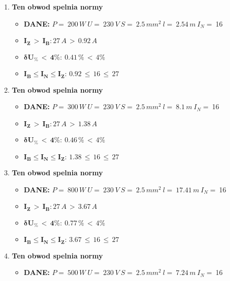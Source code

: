 \begin{enumerate}
\item \textcolor{Green}{\cmark} \textbf{Ten obwod spelnia normy} 
\begin{itemize}
\item[] \textbf{DANE: } \: $ P = \:200\, W\: U = \:230\: V\: S = \:2.5\, mm^2\: l = \:2.54\, m\: I_N= \: $16
\item[\textcolor{Green}{\cmark}] $ \pmb{I_Z \, >  \, I_B: }27 \, A \, > \,0.92 \, A $
\item[\textcolor{Green}{\cmark}] $ \pmb{ \delta U_\% \, < \, 4\%:} \:0.41 \, \% \,< \, 4\% $
\item[\textcolor{Green}{\cmark}] $ \pmb{I_B \le I_N \le I_Z: } \, 0.92 \, \le \,16 \, \le \,27 $
\end{itemize}
\item \textcolor{Green}{\cmark} \textbf{Ten obwod spelnia normy} 
\begin{itemize}
\item[] \textbf{DANE: } \: $ P = \:300\, W\: U = \:230\: V\: S = \:2.5\, mm^2\: l = \:8.1\, m\: I_N= \: $16
\item[\textcolor{Green}{\cmark}] $ \pmb{I_Z \, >  \, I_B: }27 \, A \, > \,1.38 \, A $
\item[\textcolor{Green}{\cmark}] $ \pmb{ \delta U_\% \, < \, 4\%:} \:0.46 \, \% \,< \, 4\% $
\item[\textcolor{Green}{\cmark}] $ \pmb{I_B \le I_N \le I_Z: } \, 1.38 \, \le \,16 \, \le \,27 $
\end{itemize}
\item \textcolor{Green}{\cmark} \textbf{Ten obwod spelnia normy} 
\begin{itemize}
\item[] \textbf{DANE: } \: $ P = \:800\, W\: U = \:230\: V\: S = \:2.5\, mm^2\: l = \:17.41\, m\: I_N= \: $16
\item[\textcolor{Green}{\cmark}] $ \pmb{I_Z \, >  \, I_B: }27 \, A \, > \,3.67 \, A $
\item[\textcolor{Green}{\cmark}] $ \pmb{ \delta U_\% \, < \, 4\%:} \:0.77 \, \% \,< \, 4\% $
\item[\textcolor{Green}{\cmark}] $ \pmb{I_B \le I_N \le I_Z: } \, 3.67 \, \le \,16 \, \le \,27 $
\end{itemize}
\item \textcolor{Green}{\cmark} \textbf{Ten obwod spelnia normy} 
\begin{itemize}
\item[] \textbf{DANE: } \: $ P = \:500\, W\: U = \:230\: V\: S = \:2.5\, mm^2\: l = \:7.24\, m\: I_N= \: $16

\end{itemize}
\end{enumerate}
